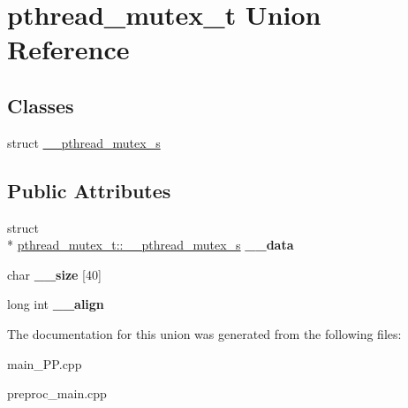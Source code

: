 \hypertarget{unionpthread__mutex__t}{\section{pthread\+\_\+mutex\+\_\+t Union Reference}
\label{unionpthread__mutex__t}
}
\subsection*{Classes}
\begin{DoxyCompactItemize}
\item 
struct \hyperlink{structpthread__mutex__t_1_1____pthread__mutex__s}{\+\_\+\+\_\+pthread\+\_\+mutex\+\_\+s}
\end{DoxyCompactItemize}
\subsection*{Public Attributes}
\begin{DoxyCompactItemize}
\item 
\hypertarget{unionpthread__mutex__t_aac7cef5b84c81089d5907f25ece33c3f}{struct \\*
\hyperlink{structpthread__mutex__t_1_1____pthread__mutex__s}{pthread\+\_\+mutex\+\_\+t\+::\+\_\+\+\_\+pthread\+\_\+mutex\+\_\+s} {\bfseries \+\_\+\+\_\+data}}\label{unionpthread__mutex__t_aac7cef5b84c81089d5907f25ece33c3f}

\item 
\hypertarget{unionpthread__mutex__t_ae61f14d5317b49e798e5a478d23892ee}{char {\bfseries \+\_\+\+\_\+size} \mbox{[}40\mbox{]}}\label{unionpthread__mutex__t_ae61f14d5317b49e798e5a478d23892ee}

\item 
\hypertarget{unionpthread__mutex__t_a89926597f356f5f994bb7a62b0e26470}{long int {\bfseries \+\_\+\+\_\+align}}\label{unionpthread__mutex__t_a89926597f356f5f994bb7a62b0e26470}

\end{DoxyCompactItemize}


The documentation for this union was generated from the following files\+:\begin{DoxyCompactItemize}
\item 
main\+\_\+\+P\+P.\+cpp\item 
preproc\+\_\+main.\+cpp\end{DoxyCompactItemize}

